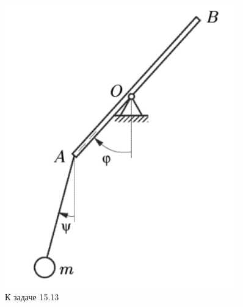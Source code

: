 \begin{figure}
\begin{minipage}[t]{0.2\textwidth}
    \includegraphics[width=0.9\textwidth]{figures/15_13.png}
    \caption{К задаче 15.13}
\end{minipage}
\end{figure}





